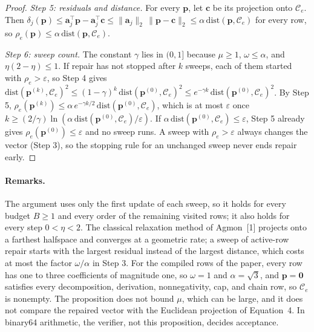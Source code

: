 \documentclass[10pt]{article}
\newcommand{\tol}{\varepsilon}
\newcommand{\pvec}{\mathbf{p}}
\newcommand{\avec}{\mathbf{a}}
\newcommand{\cvec}{\mathbf{c}}
\newcommand{\dist}{\mathrm{dist}}
\begin{document}
\begin{proof}
\emph{Step 5: residuals and distance.} For every $\pvec$, let $\cvec$ be its projection onto $\mathcal{C}_e$. Then $\delta_j(\pvec) \le \avec_j^{\top}\pvec - \avec_j^{\top}\cvec \le \lVert\avec_j\rVert_2\,\lVert\pvec - \cvec\rVert_2 \le \alpha\,\dist(\pvec,\mathcal{C}_e)$ for every row, so $\rho_e(\pvec) \le \alpha\,\dist(\pvec,\mathcal{C}_e)$.

\emph{Step 6: sweep count.} The constant $\gamma$ lies in $(0, 1]$ because $\mu \ge 1$, $\omega \le \alpha$, and $\eta(2-\eta) \le 1$. If repair has not stopped after $k$ sweeps, each of them started with $\rho_e > \tol$, so Step 4 gives $\dist(\pvec^{(k)},\mathcal{C}_e)^2 \le (1-\gamma)^k\,\dist(\pvec^{(0)},\mathcal{C}_e)^2 \le e^{-\gamma k}\,\dist(\pvec^{(0)},\mathcal{C}_e)^2$. By Step 5, $\rho_e(\pvec^{(k)}) \le \alpha\,e^{-\gamma k/2}\,\dist(\pvec^{(0)},\mathcal{C}_e)$, which is at most $\tol$ once $k \ge (2/\gamma)\ln(\alpha\,\dist(\pvec^{(0)},\mathcal{C}_e)/\tol)$. If $\alpha\,\dist(\pvec^{(0)},\mathcal{C}_e) \le \tol$, Step 5 already gives $\rho_e(\pvec^{(0)}) \le \tol$ and no sweep runs. A sweep with $\rho_e > \tol$ always changes the vector (Step 3), so the stopping rule for an unchanged sweep never ends repair early.
\end{proof}

\paragraph{Remarks.}
The argument uses only the first update of each sweep, so it holds for every budget $B \ge 1$ and every order of the remaining visited rows; it also holds for every step $0 < \eta < 2$. The classical relaxation method of Agmon~[1] projects onto a farthest halfspace and converges at a geometric rate; a sweep of active-row repair starts with the largest residual instead of the largest distance, which costs at most the factor $\omega/\alpha$ in Step 3. For the compiled rows of the paper, every row has one to three coefficients of magnitude one, so $\omega = 1$ and $\alpha = \sqrt{3}$, and $\pvec = \mathbf{0}$ satisfies every decomposition, derivation, nonnegativity, cap, and chain row, so $\mathcal{C}_e$ is nonempty. The proposition does not bound $\mu$, which can be large, and it does not compare the repaired vector with the Euclidean projection of Equation~4. In binary64 arithmetic, the verifier, not this proposition, decides acceptance.
\end{document}
